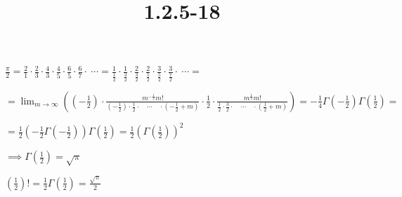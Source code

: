 \documentclass{article}
\title{1.2.5-18}
\begin{document}
\maketitle

$\frac{\pi}{2} = \frac{2}{1} \cdot \frac{2}{3} \cdot \frac{4}{3} \cdot \frac{4}{5} \cdot \frac{6}{5} \cdot \frac{6}{7} \cdot\ \cdots = \frac{1}{\frac{1}{2}} \cdot \frac{1}{\frac{3}{2}} \cdot \frac{2}{\frac{3}{2}} \cdot \frac{2}{\frac{5}{2}} \cdot \frac{3}{\frac{5}{2}} \cdot \frac{3}{\frac{7}{2}} \cdot\ \cdots =$

$= \lim_{m\to\infty} ((-\frac{1}{2}) \cdot \frac{m^{-\frac{1}{2}}m!}{(-\frac{1}{2}) \cdot \frac{1}{2} \cdot \quad \cdots \quad \cdot (-\frac{1}{2} + m)} \cdot \frac{1}{2} \cdot \frac{m^{\frac{1}{2}} m!}{\frac{1}{2} \cdot \frac{3}{2} \cdot \quad \cdots \quad \cdot (\frac{1}{2} + m)}) = -\frac{1}{4} \Gamma(-\frac{1}{2})\Gamma(\frac{1}{2}) =$

$= \frac{1}{2} (-\frac{1}{2}\Gamma(-\frac{1}{2}))\Gamma(\frac{1}{2}) = \frac{1}{2}(\Gamma(\frac{1}{2}))^2$

$\implies \Gamma(\frac{1}{2}) = \sqrt{\pi}$

$(\frac{1}{2})! = \frac{1}{2} \Gamma(\frac{1}{2}) = \frac{\sqrt{\pi}}{2}$
\end{document}
